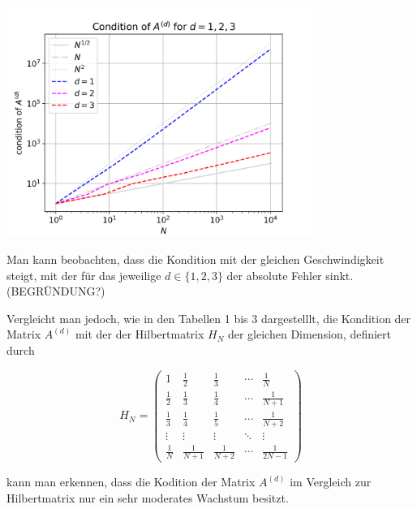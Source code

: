 \documentclass{scrartcl}
\begin{document}
{
  \centering
    \includegraphics[width=0.75\textwidth]{Grafiken/loglogcond_d123_neu}
    \vspace{-0.2cm}
}
\vspace{0.5cm}

Man kann beobachten, dass die Kondition mit der gleichen Geschwindigkeit steigt, mit der für das jeweilige $d \in \{ 1, 2, 3\}$ der absolute Fehler sinkt.
(BEGRÜNDUNG?)

Vergleicht man jedoch, wie in den Tabellen 1 bis 3 dargestelllt, die Kondition der Matrix $A^{(d)}$ mit der der Hilbertmatrix $H_N$ der gleichen Dimension, definiert durch

\[H_N =
\begin{pmatrix}
  1 & \frac{1}{2} & \frac{1}{3} & \cdots & \frac{1}{N} \\
  \frac{1}{2} & \frac{1}{3} & \frac{1}{4} & \cdots & \frac{1}{N+1} \\
  \frac{1}{3} & \frac{1}{4} & \frac{1}{5} & \cdots & \frac{1}{N+2} \\
  \vdots & \vdots & \vdots & \ddots & \vdots \\
  \frac{1}{N} & \frac{1}{N+1} & \frac{1}{N+2} & \cdots & \frac{1}{2N-1}
\end{pmatrix}\]

kann man erkennen, dass die Kodition der Matrix $A^{(d)}$ im Vergleich zur Hilbertmatrix nur ein sehr moderates Wachstum besitzt.
\end{document}
